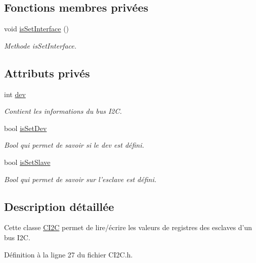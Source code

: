 \subsection*{Fonctions membres privées}
\begin{DoxyCompactItemize}
\item 
void \hyperlink{class_c_i2_c_a821adb4a309a1377fef4d1b8487a731e}{is\+Set\+Interface} ()
\begin{DoxyCompactList}\small\item\em Methode is\+Set\+Interface. \end{DoxyCompactList}\end{DoxyCompactItemize}
\subsection*{Attributs privés}
\begin{DoxyCompactItemize}
\item 
int \hyperlink{class_c_i2_c_ae2d4648eadc2acae86a49cecbf39ce56}{dev}
\begin{DoxyCompactList}\small\item\em Contient les informations du bus I2\+C. \end{DoxyCompactList}\item 
bool \hyperlink{class_c_i2_c_a892d111f995589334497f2b573ab436d}{is\+Set\+Dev}
\begin{DoxyCompactList}\small\item\em Bool qui permet de savoir si le dev est défini. \end{DoxyCompactList}\item 
bool \hyperlink{class_c_i2_c_a19200c12efe17b560256641cce4f5909}{is\+Set\+Slave}
\begin{DoxyCompactList}\small\item\em Bool qui permet de savoir sur l'esclave est défini. \end{DoxyCompactList}\end{DoxyCompactItemize}


\subsection{Description détaillée}
Cette classe \hyperlink{class_c_i2_c}{C\+I2\+C} permet de lire/écrire les valeurs de registres des esclaves d'un bus I2\+C. 

Définition à la ligne 27 du fichier C\+I2\+C.\+h.



